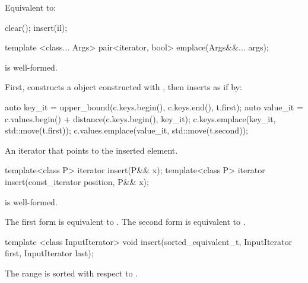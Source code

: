 \begin{codeblock}
\begin{codeblock}
\begin{codeblock}
\begin{addedblock}
\begin{itemdescr}
\pnum
\effects Equivalent to:
\begin{codeblock}
clear();
insert(il);
\end{codeblock}
\end{itemdescr}

%
\begin{itemdecl}
template <class... Args> pair<iterator, bool> emplace(Args&&... args);
\end{itemdecl}

\begin{itemdescr}
\pnum \constraints {} is well-formed.

\pnum
\effects
First, constructs a  object 
constructed with , then inserts 
as if by:
\begin{codeblock}
auto key_it = upper_bound(c.keys.begin(), c.keys.end(), t.first);
auto value_it = c.values.begin() + distance(c.keys.begin(), key_it);
c.keys.emplace(key_it, std::move(t.first));
c.values.emplace(value_it, std::move(t.second));
\end{codeblock}

\pnum
\returns
An iterator that points to the inserted element.
\end{itemdescr}

%
\begin{itemdecl}
template<class P> iterator insert(P&& x);
template<class P> iterator insert(const_iterator position, P&& x);
\end{itemdecl}

\begin{itemdescr}
\pnum \constraints {} is well-formed.

\pnum
\effects
The first form is equivalent to
. The second form is
equivalent to .
\end{itemdescr}

%
\begin{itemdecl}
template <class InputIterator>
  void insert(sorted_equivalent_t, InputIterator first, InputIterator last);
\end{itemdecl}

\begin{itemdescr}
\pnum \expects
The range  is sorted with respect to .


\end{itemdescr}
\end{addedblock}
\end{codeblock}
\end{codeblock}
\end{codeblock}
